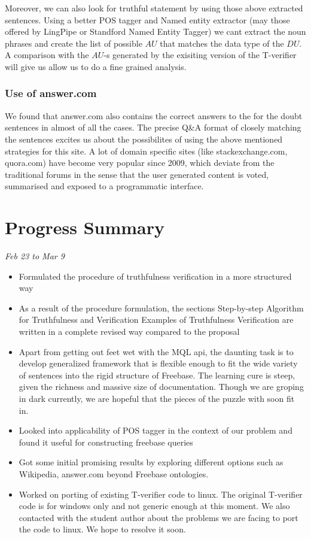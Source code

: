 \documentclass[11pt]{article}
\begin{document}
Moreover, we can also look for truthful statement by using those above extracted sentences. Using a better POS tagger and Named entity extractor (may those offered by LingPipe or Standford Named Entity Tagger) we cant extract the noun phrases and create the list of possible $AU$ that matches the data type of the $DU$. A comparison with the $AU$-s generated by the exisiting version of the T-verifier will give us allow us to do a fine grained analysis.

\subsubsection{Use of answer.com}
We found that answer.com also contains the correct answers to the for the doubt sentences in almost of all the cases. The precise Q\&A format of closely matching the sentences excites us about the possibilites of using the above mentioned strategies for this site. A lot of domain specific sites (like stackexchange.com, quora.com) have become very popular since 2009, which deviate from the traditional forums in the sense that the user generated content is voted, summarised and exposed to a programmatic interface. 

\section{Progress Summary}

{\em Feb 23 to Mar 9} 
\begin{itemize}
\item Formulated the procedure of truthfulness verification in a more structured way
\item As a result of the procedure formulation, the sections Step-by-step Algorithm for Truthfulness and Verification Examples of Truthfulness Verification are written in a complete revised way compared to the proposal
\item Apart from getting out feet wet with the MQL api, the daunting task is to develop generalized framework that is flexible enough to fit the wide variety of sentences into the rigid structure of Freebase. The learning cure is steep, given the richness and massive size of documentation. Though we are groping in dark currently, we are hopeful that the pieces of the puzzle with soon fit in.
\item Looked into applicability of POS tagger in the context of our problem and found it useful for constructing freebase queries
\item Got some initial promising results by exploring different options such as Wikipedia, answer.com beyond Freebase ontologies. 
\item Worked on porting of existing T-verifier code to linux. The original T-verifier code is for windows only and not generic enough at this moment. We also contacted with the student author about the problems we are facing to port the code to linux. We hope to resolve it soon.
\end{itemize}
\end{document}
